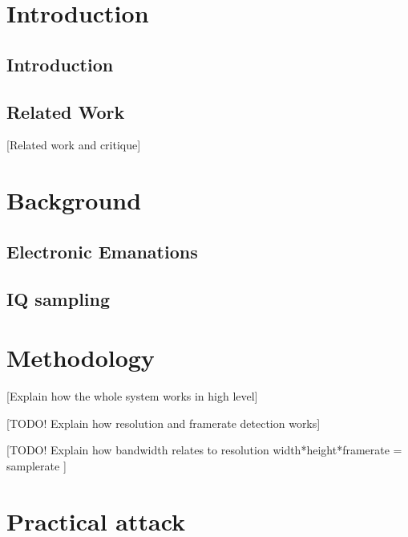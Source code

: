 \documentclass[a4paper,12pt,twoside,openright]{report}
\begin{document}
\pagestyle{empty}
\singlespacing

\onehalfspacing

\singlespacing


\setcounter{page}{0}
\pagestyle{plain}
\tableofcontents

\onehalfspacing


\chapter{Introduction}
\setcounter{page}{1} 

\section{Introduction} 

\section{Related Work} 

[Related work and critique]

\cite{kuhn2003compromising}

\chapter{Background}

\section{Electronic Emanations} 

\section{IQ sampling} 

\chapter{Methodology} 

[Explain how the whole system works in high level]

[TODO! Explain how resolution and framerate detection works]

[TODO! Explain how bandwidth relates to resolution width*height*framerate = samplerate ]

\chapter{Practical attack} 
\end{document}
